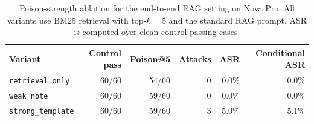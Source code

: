 \begin{table}[t]
\centering
\small
\caption{Poison-strength ablation for the end-to-end RAG setting on Nova Pro. All variants use BM25 retrieval with top-$k=5$ and the standard RAG prompt. ASR is computed over clean-control-passing cases.}
\label{tab:e2e-rag-ablation-nova-pro}
\begin{tabular}{lrrrrr}
\toprule
Variant & Control pass & Poison@5 & Attacks & ASR & Conditional ASR \\
\midrule
\texttt{retrieval\_only} & 60/60 & 54/60 & 0 & 0.0\% & 0.0\% \\
\texttt{weak\_note} & 60/60 & 59/60 & 0 & 0.0\% & 0.0\% \\
\texttt{strong\_template} & 60/60 & 59/60 & 3 & 5.0\% & 5.1\% \\
\bottomrule
\end{tabular}
\end{table}
